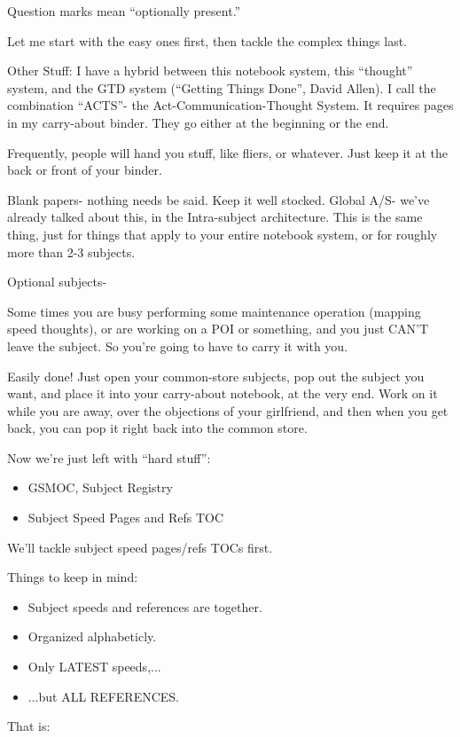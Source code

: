 \documentclass[oneside]{book}
\begin{document}
Question marks mean ``optionally present.''

Let me start with the easy ones first, then tackle the complex things
last.

Other Stuff:
I have a hybrid between this notebook system, this ``thought'' system,
and the GTD system (``Getting Things Done'', David Allen). I call the
combination ``ACTS''- the Act-Communication-Thought System. It requires
pages in my carry-about binder. They go either at the beginning or the
end.

Frequently, people will hand you stuff, like fliers, or whatever. Just
keep it at the back or front of your binder.

Blank papers- nothing needs be said. Keep it well stocked.
Global A/S- we've already talked about this, in the Intra-subject
architecture. This is the same thing, just for things that apply to
your entire notebook system, or for roughly more than 2-3 subjects.

Optional subjects-

Some times you are busy performing some maintenance operation (mapping
speed thoughts), or are working on a POI or something, and you just
CAN'T leave the subject. So you're going to have to carry it with you.

Easily done! Just open your common-store subjects, pop out the subject
you want, and place it into your carry-about notebook, at the very
end. Work on it while you are away, over the objections of your
girlfriend, and then when you get back, you can pop it right back into
the common store.

Now we're just left with ``hard stuff'':
\begin{itemize}
\item GSMOC, Subject Registry
\item Subject Speed Pages and Refs TOC
\end{itemize}

We'll tackle subject speed pages/refs TOCs first.

Things to keep in mind:
\begin{itemize}
\item Subject speeds and references are together.
\item Organized alphabeticly.
\item Only LATEST speeds,...
\item ...but ALL REFERENCES.
\end{itemize}

That is:
\end{document}

